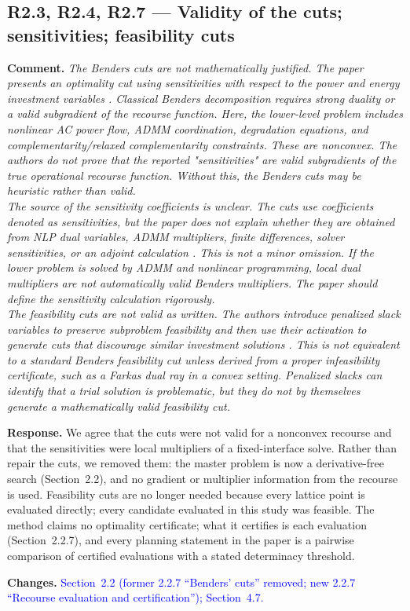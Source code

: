 \documentclass[11pt]{article}
\newcommand{\rcomment}[1]{\par\medskip\noindent\textbf{Comment.} \textit{#1}\par\smallskip}
\newcommand{\rresponse}[1]{\noindent\textbf{Response.} #1\par\smallskip}
\newcommand{\rchanges}[1]{\noindent\textbf{Changes.} \textcolor{blue}{#1}\par\medskip}
\begin{document}
\subsection*{R2.3, R2.4, R2.7 --- Validity of the cuts; sensitivities; feasibility cuts}
\rcomment{
The Benders cuts are not mathematically justified. The paper presents an optimality cut using sensitivities with respect to the power and energy investment variables . Classical Benders decomposition requires strong duality or a valid subgradient of the recourse function. Here, the lower-level problem includes nonlinear AC power flow, ADMM coordination, degradation equations, and complementarity/relaxed complementarity constraints. These are nonconvex. The authors do not prove that the reported "sensitivities" are valid subgradients of the true operational recourse function. Without this, the Benders cuts may be heuristic rather than valid.\\
The source of the sensitivity coefficients is unclear. The cuts use coefficients denoted as sensitivities, but the paper does not explain whether they are obtained from NLP dual variables, ADMM multipliers, finite differences, solver sensitivities, or an adjoint calculation . This is not a minor omission. If the lower problem is solved by ADMM and nonlinear programming, local dual multipliers are not automatically valid Benders multipliers. The paper should define the sensitivity calculation rigorously.\\
The feasibility cuts are not valid as written. The authors introduce penalized slack variables to preserve subproblem feasibility and then use their activation to generate cuts that discourage similar investment solutions . This is not equivalent to a standard Benders feasibility cut unless derived from a proper infeasibility certificate, such as a Farkas dual ray in a convex setting. Penalized slacks can identify that a trial solution is problematic, but they do not by themselves generate a mathematically valid feasibility cut.
}
\rresponse{We agree that the cuts were not valid for a nonconvex recourse and that the sensitivities were
local multipliers of a fixed-interface solve. Rather than repair the cuts, we removed them: the master
problem is now a derivative-free search (Section~2.2), and no gradient or multiplier information from
the recourse is used. Feasibility cuts are no longer needed because every lattice point is evaluated
directly; every candidate evaluated in this study was feasible. The method claims no optimality
certificate; what it certifies is each evaluation (Section~2.2.7), and every planning statement in the
paper is a pairwise comparison of certified evaluations with a stated determinacy threshold.}
\rchanges{Section~2.2 (former 2.2.7 ``Benders' cuts'' removed; new 2.2.7 ``Recourse evaluation and
certification''); Section~4.7.}
\end{document}
